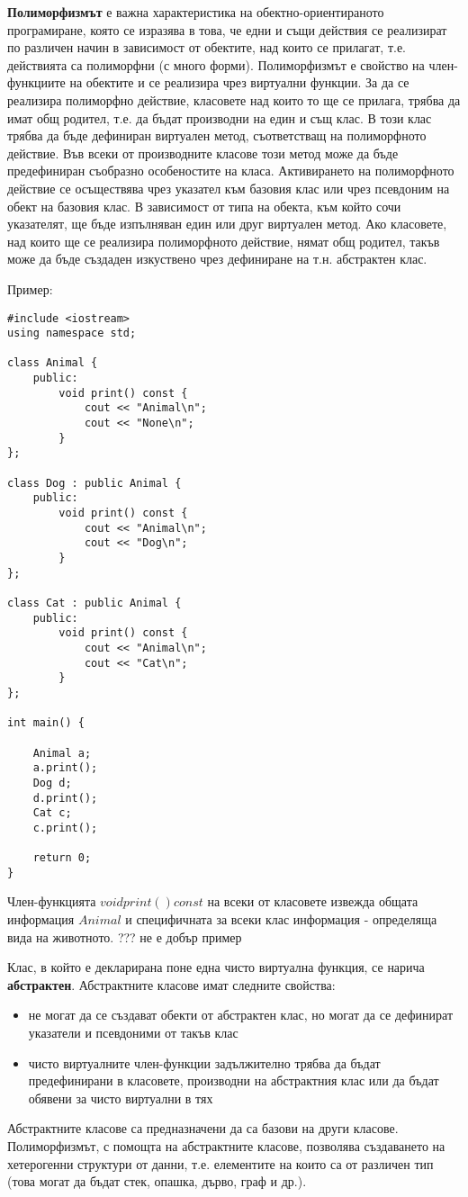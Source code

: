 \documentclass{article}
\begin{document}
\textbf{Полиморфизмът} е важна характеристика на обектно-ориентираното програмиране, която се изразява в това, че едни и същи
действия се реализират по различен начин в зависимост от обектите, над които се прилагат, т.е. действията са полиморфни
(с много форми). Полиморфизмът е свойство на член-функциите на обектите и се реализира чрез виртуални функции. За да се реализира
полиморфно действие, класовете над които то ще се прилага, трябва да имат общ родител, т.е. да бъдат производни на един и същ
клас. В този клас трябва да бъде дефиниран виртуален метод, съответстващ на полиморфното действие. Във всеки от производните
класове този метод може да бъде предефиниран съобразно особеностите на класа. Активирането на полиморфното действие се осъществява
чрез указател към базовия клас или чрез псевдоним на обект на базовия клас. В зависимост от типа на обекта, към който сочи
указателят, ще бъде изпълняван един или друг виртуален метод. Ако класовете, над които ще се реализира полиморфното действие,
нямат общ родител, такъв може да бъде създаден изкуствено чрез дефиниране на т.н. абстрактен клас.

Пример:
\begin{lstlisting}
#include <iostream>
using namespace std;

class Animal {
    public:
        void print() const {
            cout << "Animal\n";
            cout << "None\n";
        }
};

class Dog : public Animal {
    public:
        void print() const {
            cout << "Animal\n";
            cout << "Dog\n";
        }
};

class Cat : public Animal {
    public:
        void print() const {
            cout << "Animal\n";
            cout << "Cat\n";
        }
};

int main() {

    Animal a;
    a.print();
    Dog d;
    d.print();
    Cat c;
    c.print();

    return 0;
}
\end{lstlisting}
Член-функцията $void print() const$ на всеки от класовете извежда общата информация $Animal$ и специфичната за всеки клас
информация - определяща вида на животното. ??? не е добър пример

Клас, в който е декларирана поне една чисто виртуална функция, се нарича \textbf{абстрактен}. Абстрактните класове имат следните
свойства:
\begin{itemize}
    \item не могат да се създават обекти от абстрактен клас, но могат да се дефинират указатели и псевдоними от такъв клас
    \item чисто виртуалните член-функции задължително трябва да бъдат предефинирани в класовете, производни на абстрактния клас
    или да бъдат обявени за чисто виртуални в тях
\end{itemize}
Абстрактните класове са предназначени да са базови на други класове. Полиморфизмът, с помощта на абстрактните класове, позволява
създаването на хетерогенни структури от данни, т.е. елементите на които са от различен тип (това могат да бъдат стек, опашка,
дърво, граф и др.).
\end{document}
